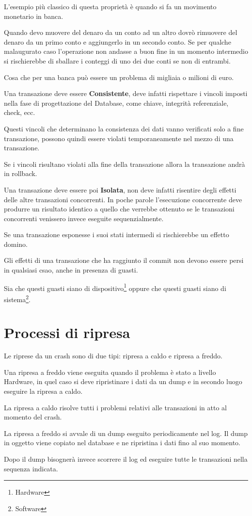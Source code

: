 \begin{exmp}
    L'esempio più classico di questa proprietà è quando si fa un movimento monetario in banca.
    
    Quando devo muovere del denaro da un conto ad un altro dovrò rimuovere del denaro da un primo conto e aggiungerlo in un secondo conto. Se per qualche malaugurato caso l'operazione non andasse a buon fine in un momento intermedio si rischierebbe di sballare i conteggi di uno dei due conti se non di entrambi.
    
    Cosa che per una banca può essere un problema di migliaia o milioni di euro.
\end{exmp}

Una transazione deve essere \textbf{Consistente}, deve infatti rispettare i vincoli imposti nella fase di progettazione del Database, come chiave, integrità referenziale, check, ecc.

Questi vincoli che determinano la consistenza dei dati vanno verificati solo a fine transazione, possono quindi essere violati temporaneamente nel mezzo di una transazione.

Se i vincoli risultano violati alla fine della transazione allora la transazione andrà in rollback.

Una transazione deve essere poi \textbf{Isolata}, non deve infatti risentire degli effetti delle altre transazioni concorrenti. In poche parole l'esecuzione concorrente deve produrre un risultato identico a quello che verrebbe ottenuto se le transazioni concorrenti venissero invece eseguite sequenzialmente.

Se una transazione esponesse i suoi stati intermedi si rischierebbe un effetto domino.

Gli effetti di una transazione che ha raggiunto il commit non devono essere persi in qualsiasi csao, anche in presenza di guasti.

Sia che questi guasti siano di dispositivo\footnote{Hardware} oppure che questi guasti siano di sistema\footnote{Software}.

\section{Processi di ripresa}

Le riprese da un crash sono di due tipi: ripresa a caldo e ripresa a freddo.

Una ripresa a freddo viene eseguita quando il problema è stato a livello Hardware, in quel caso si deve ripristinare i dati da un dump e in secondo luogo eseguire la ripresa a caldo.

La ripresa a caldo risolve tutti i problemi relativi alle transazioni in atto al momento del crash.

La ripresa a freddo si avvale di un dump eseguito periodicamente nel log. Il dump in oggetto viene copiato nel database e ne ripristina i dati fino al suo momento.

Dopo il dump bisognerà invece scorrere il log ed eseguire tutte le transazioni nella sequenza indicata.
